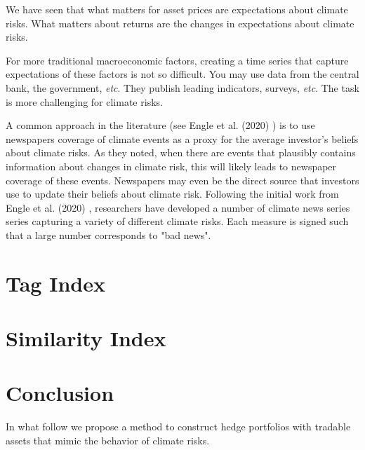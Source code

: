 We have seen that what matters for asset prices
are expectations about climate risks. What 
matters about returns are the changes in
expectations about climate risks.

For more traditional macroeconomic factors, 
creating a time series that capture expectations 
of these factors is not so difficult. You may 
use data from the central bank, the government,
\textit{etc}. They publish leading indicators,
surveys, \textit{etc}. The task is more 
challenging for climate risks.

A common approach in the literature (see Engle et al. (2020) \cite{engle2020hedging})
is to use newspapers coverage of climate events as a proxy 
for the average investor's beliefs about climate risks.
As they noted, when there are events that plausibly
contains information about changes in climate risk,
this will likely leads to newspaper coverage of these events.
Newspapers may even be the direct source that investors
use to update their beliefs about climate risk.
Following the initial work from Engle et al. (2020) \cite{engle2020hedging},
researchers have developed a number of climate 
news series series capturing a variety of different climate risks.
Each measure is signed such that a large number 
corresponds to "bad news".




\section{Tag Index}


\section{Similarity Index}

\section{Conclusion}

In what follow we propose a method to construct
hedge portfolios with tradable assets that
mimic the behavior of climate risks. 
